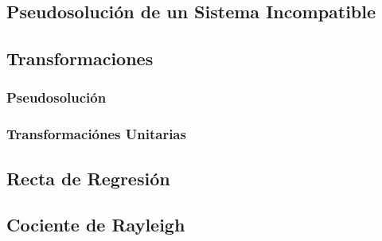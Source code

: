 \subsection{Pseudosolución de un Sistema Incompatible}
\subsection{Transformaciones}
\subsubsection{Pseudosolución}
\subsubsection{Transformaciónes Unitarias}
\subsection{Recta de Regresión}
\subsection{Cociente de Rayleigh}